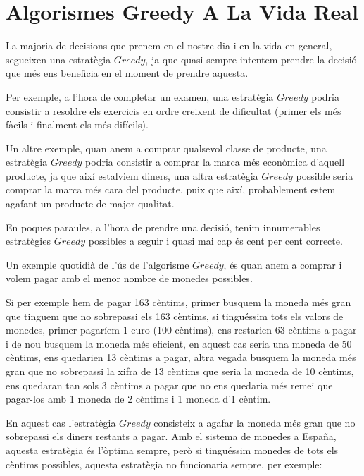 \section{Algorismes Greedy A La Vida Real}

La majoria de decisions que prenem en el nostre dia i en la vida en general, segueixen una estratègia $Greedy$, ja que quasi sempre intentem prendre la decisió que més ens beneficia en el moment de prendre aquesta. \newline

Per exemple, a l'hora de completar un examen, una estratègia $Greedy$ podria consistir a resoldre els exercicis en ordre creixent de dificultat (primer els més fàcils i finalment els més difícils).

Un altre exemple, quan anem a comprar qualsevol classe de producte, una estratègia $Greedy$ podria consistir a comprar la marca més econòmica d'aquell producte, ja que així estalviem diners, una altra estratègia $Greedy$ possible seria comprar la marca més cara del producte, puix que així, probablement estem agafant un producte de major qualitat. \newline

En poques paraules, a l'hora de prendre una decisió, tenim innumerables estratègies $Greedy$ possibles a seguir i quasi mai cap és cent per cent correcte.
\newline



Un exemple quotidià de l'ús de l'algorisme $Greedy$, és quan anem a comprar i volem pagar amb el menor nombre de monedes possibles.

Si per exemple hem de pagar 163 cèntims, primer busquem la moneda més gran que tinguem que no sobrepassi els 163 cèntims, si tinguéssim tots els valors de monedes, primer pagaríem 1 euro (100 cèntims), ens restarien 63 cèntims a pagar i de nou busquem la moneda més eficient, en aquest cas seria una moneda de 50 cèntims, ens quedarien 13 cèntims a pagar, altra vegada busquem la moneda més gran que no sobrepassi la xifra de 13 cèntims que seria la moneda de 10 cèntims, ens quedaran tan sols 3 cèntims a pagar que no ens quedaria més remei que pagar-los amb 1 moneda de 2 cèntims i 1 moneda d'1 cèntim.
\newline

En aquest cas l'estratègia $Greedy$ consisteix a agafar la moneda més gran que no sobrepassi els diners restants a pagar. Amb el sistema de monedes a España, aquesta estratègia és l'òptima sempre, però si tinguéssim monedes de tots els cèntims possibles, aquesta estratègia no funcionaria sempre, per exemple:

